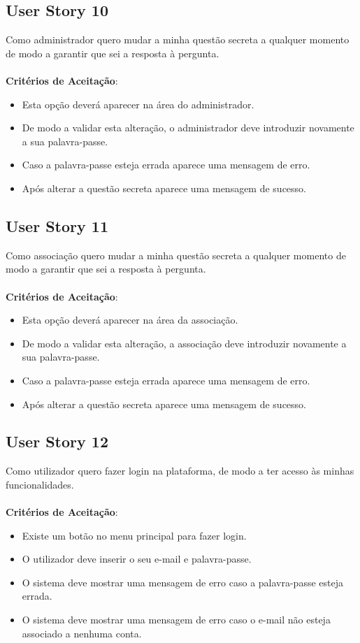 \documentclass[a4paper,11pt]{article}
\begin{document}
\subsection*{User Story 10}
Como administrador quero mudar a minha questão secreta a qualquer momento de modo a garantir que sei a resposta à pergunta.\\\\
\textbf{Critérios de Aceitação}:
\begin{itemize}
  \item Esta opção deverá aparecer na área do administrador.
  \item De modo a validar esta alteração, o administrador deve introduzir novamente a sua palavra-passe.
  \item Caso a palavra-passe esteja errada aparece uma mensagem de erro.
  \item Após alterar a questão secreta aparece uma mensagem de sucesso.
\end{itemize}

\subsection*{User Story 11}
Como associação quero mudar a minha questão secreta a qualquer momento de modo a garantir que sei a resposta à pergunta.\\\\
\textbf{Critérios de Aceitação}:
\begin{itemize}
  \item Esta opção deverá aparecer na área da associação.
  \item De modo a validar esta alteração, a associação deve introduzir novamente a sua palavra-passe.
  \item Caso a palavra-passe esteja errada aparece uma mensagem de erro.
  \item Após alterar a questão secreta aparece uma mensagem de sucesso.
\end{itemize}

\subsection*{User Story 12}
Como utilizador quero fazer login na plataforma, de modo a ter acesso às minhas funcionalidades.\\\\
\textbf{Critérios de Aceitação}:
\begin{itemize}
  \item Existe um botão no menu principal para fazer login.
  \item O utilizador deve inserir o seu e-mail e palavra-passe.
  \item O sistema deve mostrar uma mensagem de erro caso a palavra-passe esteja errada.
  \item O sistema deve mostrar uma mensagem de erro caso o e-mail não esteja associado a nenhuma conta.
\end{itemize}
\end{document}
